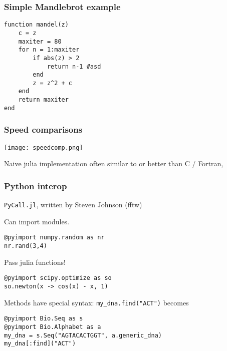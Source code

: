 \documentclass[16pt]{beamer}
\begin{document}


\begin{frame}[fragile]
\frametitle{Simple Mandlebrot example}

\begin{lstlisting}
function mandel(z)
    c = z
    maxiter = 80
    for n = 1:maxiter
        if abs(z) > 2
            return n-1 #asd
        end
        z = z^2 + c
    end
    return maxiter
end
\end{lstlisting}
\end{frame}


\begin{frame}
  \frametitle{Speed comparisons}
  \begin{centering}
  \texttt{[image: speedcomp.png]}
  \end{centering}
  Naive julia implementation often similar to or better than C / Fortran, 
\end{frame}

\begin{frame}[fragile]
  \frametitle{Python interop}
  \verb|PyCall.jl|, written by Steven Johnson (fftw)

  Can import modules.
  \begin{lstlisting}
@pyimport numpy.random as nr
nr.rand(3,4)
  \end{lstlisting}
  
  Pass julia functions!
  \begin{lstlisting}
@pyimport scipy.optimize as so
so.newton(x -> cos(x) - x, 1)
  \end{lstlisting}
  
  Methods have special syntax: \verb|my_dna.find("ACT")| becomes
  \begin{lstlisting}
@pyimport Bio.Seq as s
@pyimport Bio.Alphabet as a
my_dna = s.Seq("AGTACACTGGT", a.generic_dna)
my_dna[:find]("ACT")
  \end{lstlisting}
  \begin{centering}
  \end{centering}
\end{frame}
\end{document}
